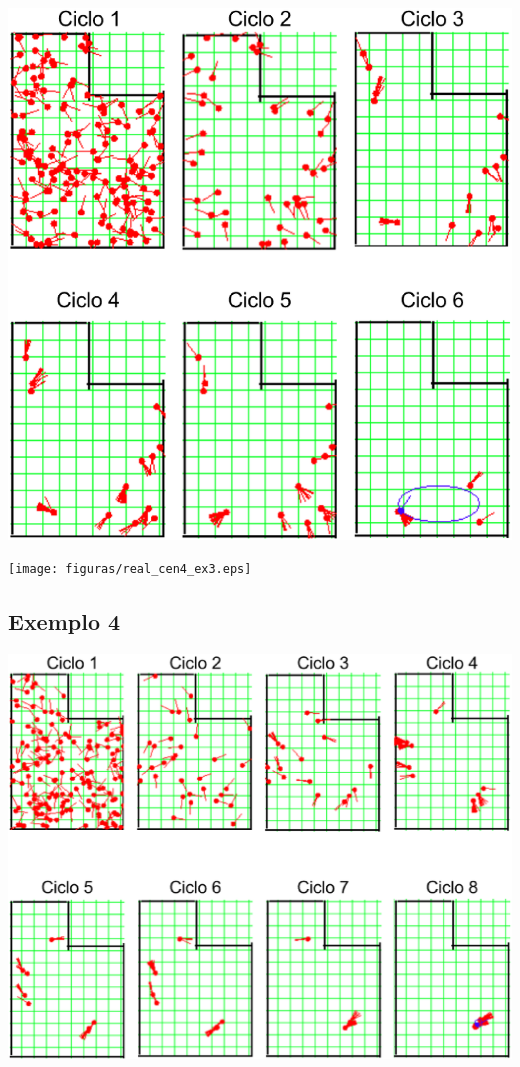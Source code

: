 {\centering
\includegraphics[scale=0.4]{figuras/cen4_ex3.eps}
\label{img:cen4_ex3}
\par}

{\centering
\texttt{[image: figuras/real\_cen4\_ex3.eps]}
\label{img:real_cen4_ex3}
\par}

\subsection{Exemplo 4}

{\centering
\includegraphics[scale=0.4]{figuras/cen4_ex4.eps}
\label{img:cen4_ex4}
\par}

